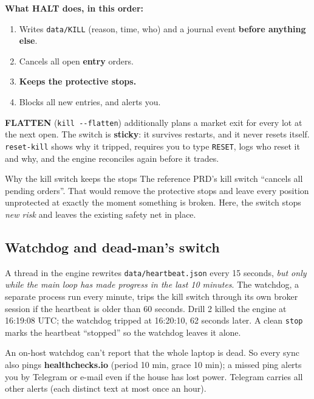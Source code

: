 \documentclass[11pt,a4paper]{article}
\newcommand\code[1]{\texttt{#1}}
\begin{document}
\textbf{What HALT does, in this order:}
\begin{enumerate}
  \item Writes \code{data/KILL} (reason, time, who) and a journal event \textbf{before anything else}.
  \item Cancels all open \textbf{entry} orders.
  \item \textbf{Keeps the protective stops.}
  \item Blocks all new entries, and alerts you.
\end{enumerate}
\textbf{FLATTEN} (\code{kill -{}-flatten}) additionally plans a market exit for every lot at the next open. The switch is
\textbf{sticky}: it survives restarts, and it never resets itself. \code{reset-kill} shows why it tripped, requires you to type
\code{RESET}, logs who reset it and why, and the engine reconciles again before it trades.
\begin{callout}[bad]{Why the kill switch keeps the stops}
The reference PRD's kill switch ``cancels all pending orders''. That would remove the protective stops and leave every
position unprotected at exactly the moment something is broken. Here, the switch stops \emph{new risk} and leaves the
existing safety net in place.
\end{callout}

\subsection{Watchdog and dead-man's switch}
A thread in the engine rewrites \code{data/heartbeat.json} every 15 seconds, \emph{but only while the main loop has made
progress in the last 10 minutes}. The watchdog, a separate process run every minute, trips the kill switch through its own
broker session if the heartbeat is older than 60 seconds. Drill 2 killed the engine at 16:19:08 UTC; the watchdog tripped at
16:20:10, 62 seconds later. A clean \code{stop} marks the heartbeat ``stopped'' so the watchdog leaves it alone.

An on-host watchdog can't report that the whole laptop is dead. So every sync also pings \textbf{healthchecks.io} (period
10 min, grace 10 min); a missed ping alerts you by Telegram or e-mail even if the house has lost power. Telegram carries all
other alerts (each distinct text at most once an hour).
\end{document}
